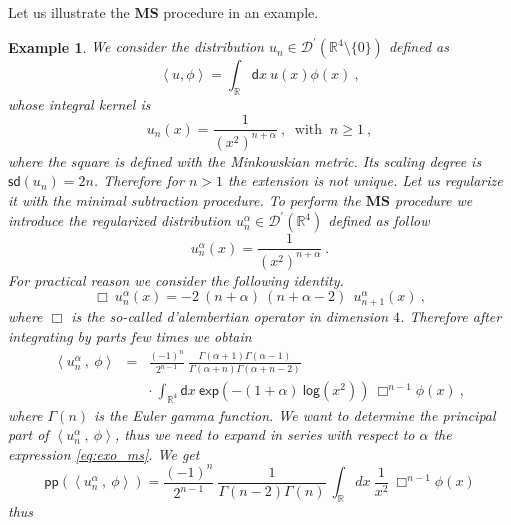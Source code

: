 \documentclass[11pt]{book}
\newcommand{\pp}{\mathsf{pp}}
\newcommand{\sd}{\mathsf{sd}}
\newcommand{\MS}{\textbf{MS}}
\renewcommand{\exp}{\mathsf{exp}}
\renewcommand{\log}{\mathsf{log}}
\newcommand{\sm}[1]{\left\langle#1\right\rangle}
\newcommand{\Dcal}{\mathcal{D}}
\newcommand{\Rbb}{\mathbb{R}}
\newcommand{\dsf}{\mathsf{d}}
\theoremstyle{break}
\newtheorem{example}{Example}[chapter]
\begin{document}
\bigskip


Let us illustrate the $\MS$ procedure in an example. 


\begin{example}\label{exo:ms_numeric}
We consider the distribution $u_n \in \Dcal^\prime(\Rbb^4\setminus\{0\})$ defined as 
%
\begin{equation*}
\sm{u, \phi} = \int_{\Rbb} \dsf x \ u(x) \phi(x)  \ ,
\end{equation*}
%
whose integral kernel is 
%
\begin{equation*}
u_n(x) = \frac{1}{(x^2)^{n+\alpha}} \ , \ \mbox{ with } \ n \geq 1 \ ,
\end{equation*}
%
where the square is defined with the Minkowskian metric. Its scaling degree is $\sd(u_n)=2n$. Therefore for $n>1$ the extension is not unique. Let us regularize it with the minimal subtraction procedure. To perform the $\MS$ procedure we introduce the regularized distribution $u^\alpha_n \in \Dcal^\prime(\Rbb^4)$ defined as follow
%
\begin{equation*}
u^\alpha_n(x) = \frac{1}{(x^2)^{n+\alpha}} \ .
\end{equation*}
%
For practical reason we consider the following identity. 
%
\begin{equation*}
\Box \ u^\alpha_n(x) = - 2 \ (n+\alpha) \ (n+\alpha-2) \ \ u^\alpha_{n+1}(x)  \ , 
\label{eq:relation_exo_ms}
\end{equation*}
%
where $\Box$ is the so-called d'alembertian operator in dimension $4$. Therefore after integrating by parts few times we obtain
%
\begin{eqnarray}
\sm{u^\alpha_n \ , \ \phi} &=& \frac{(-1)^{n}}{2^{n-1}} \ \frac{\Gamma(\alpha+1)\Gamma(\alpha-1)}{\Gamma(\alpha+n)\Gamma(\alpha+n-2)} \nonumber \\
&& \cdot \ \int_{\Rbb^4} \dsf x \ \exp\left(-(1+\alpha) \ \log\left(x^2\right)\right) \ \Box^{n-1}\phi(x) \ , 
\label{eq:exo_ms}
\end{eqnarray}
%
where $\Gamma(n)$ is the Euler gamma function. We want to determine the principal part of $\sm{u^\alpha_n \ , \ \phi}$, thus we need to expand in series with respect to $\alpha$ the expression \eqref{eq:exo_ms}. We get
%
\begin{equation*}
\pp\left(\sm{u^\alpha_n \ , \ \phi}\right) = \frac{(-1)^{n}}{2^{n-1}} \ \frac{1}{\Gamma(n-2)\Gamma(n)} \ \int_{\Rbb} dx \ \frac{1}{x^2} \ \Box^{n-1}\phi(x) 
\end{equation*}
%
thus
%
\begin{eqnarray*}

\end{eqnarray*}
\end{example}
\end{document}
